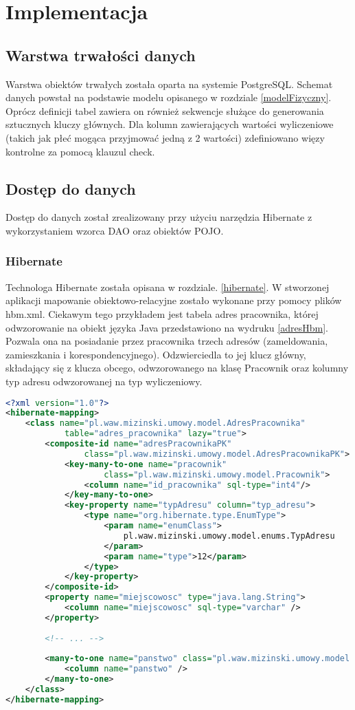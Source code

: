 \chapter{Implementacja}
\label{chap6}

\section{Warstwa trwałości danych}
Warstwa obiektów trwałych została oparta na systemie PostgreSQL. Schemat danych powstał na podstawie modelu opisanego w rozdziale \ref{modelFizyczny}. Oprócz definicji tabel zawiera on również sekwencje służące do generowania sztucznych kluczy głównych. Dla kolumn zawierających wartości wyliczeniowe (takich jak płeć mogąca przyjmować jedną z 2 wartości) zdefiniowano więzy kontrolne za pomocą klauzul check.

\section{Dostęp do danych}
Dostęp do danych został zrealizowany przy użyciu narzędzia Hibernate z wykorzystaniem wzorca DAO oraz obiektów POJO.

\subsection[Hibernate][Hibernate]{Hibernate} 
Technologa Hibernate została opisana w rozdziale. \ref{hibernate}. W stworzonej aplikacji mapowanie obiektowo-relacyjne zostało wykonane przy pomocy plików hbm.xml. Ciekawym tego przykładem jest tabela adres pracownika, której odwzorowanie na obiekt języka Java przedstawiono na wydruku \ref{adresHbm}. Pozwala ona na posiadanie przez pracownika trzech adresów (zameldowania, zamieszkania i korespondencyjnego). Odzwierciedla to jej klucz główny, składający się z klucza obcego, odwzorowanego na klasę Pracownik oraz kolumny typ adresu odwzorowanej na typ wyliczeniowy.

\begin{lstlisting}[language=XML,style=outcode,showstringspaces=false, caption=Mapowanie tabeli Adres pracownika w postaci pliku hbm.xml,label={adresHbm}]
<?xml version="1.0"?>
<hibernate-mapping>
	<class name="pl.waw.mizinski.umowy.model.AdresPracownika"
			table="adres_pracownika" lazy="true">
		<composite-id name="adresPracownikaPK" 
				class="pl.waw.mizinski.umowy.model.AdresPracownikaPK">
			<key-many-to-one name="pracownik" 
					class="pl.waw.mizinski.umowy.model.Pracownik">
				<column name="id_pracownika" sql-type="int4"/>
			</key-many-to-one>
			<key-property name="typAdresu" column="typ_adresu">
				<type name="org.hibernate.type.EnumType">
					<param name="enumClass">
						pl.waw.mizinski.umowy.model.enums.TypAdresu
					</param>
					<param name="type">12</param>
				</type>
			</key-property>
		</composite-id>
		<property name="miejscowosc" type="java.lang.String">
			<column name="miejscowosc" sql-type="varchar" />
		</property>
		
		<!-- ... -->
		
		<many-to-one name="panstwo" class="pl.waw.mizinski.umowy.model.Panstwo">
			<column name="panstwo" />
		</many-to-one>
	</class>
</hibernate-mapping>
\end{lstlisting}

